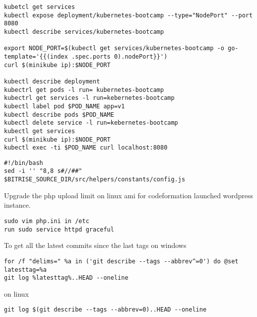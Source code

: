 \begin{lstlisting}[caption={Bash Script for kubernates}]
kubetcl get services
kubectl expose deployment/kubernetes-bootcamp --type="NodePort" --port 8080
kubectl describe services/kubernetes-bootcamp

export NODE_PORT=$(kubectl get services/kubernetes-bootcamp -o go-template='{{(index .spec.ports 0).nodePort}}')
curl $(minikube ip):$NODE_PORT

kubectl describe deployment
kubectrl get pods -l run= kubernetes-bootcamp 
kubectrl get services -l run=kebernetes-bootcamp
kubectl label pod $POD_NAME app=v1
kubectl describe pods $POD_NAME
kubectl delete service -l run=kebernetes-bootcamp
kubectl get services 
curl $(minikube ip):$NODE_PORT 
kubectl exec -ti $POD_NAME curl localhost:8080
\end{lstlisting}


\begin{lstlisting}[caption={Bash Script uncomment line in sed for osx}]
#!/bin/bash
sed -i '' "8,8 s#//##" $BITRISE_SOURCE_DIR/src/helpers/constants/config.js
\end{lstlisting}

Upgrade the php upload limit on linux ami for codeformation launched wordpress instance.

\begin{verbatim}
sudo vim php.ini in /etc
run sudo service httpd graceful
\end{verbatim}








To get all the latest commits since the last tags on windows
\begin{verbatim}
for /f "delims=" %a in ('git describe --tags --abbrev^=0') do @set latesttag=%a
git log %latesttag%..HEAD --oneline
\end{verbatim}

on linux

\begin{verbatim}
git log $(git describe --tags --abbrev=0)..HEAD --oneline
\end{verbatim}